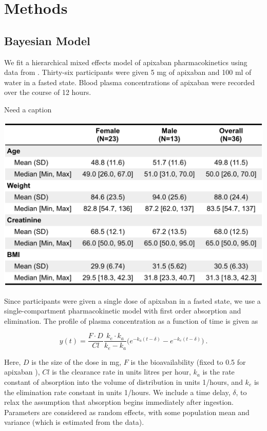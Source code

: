 \section{Methods}

\subsection*{Bayesian Model}

We fit a hierarchical mixed effects model of apixaban pharmacokinetics using data from \cite{Beaton2018-el}.  Thirty-six participants were given 5 mg of apixaban and 100 ml of water in a fasted state. Blood plasma concentrations of apixaban were recorded over the course of 12 hours.



\begin{table}[htb]
	\centering
	\caption{Need a caption} 
	\label{tab:my table} 
	\includegraphics[width=0.7\linewidth]{figs/table1}
\end{table}


\noindent Since participants were given a single dose of apixaban in a fasted state, we use a single-compartment pharmacokinetic model with first order absorption and elimination. The profile of plasma concentration as a function of time is given as

\begin{equation} \label{eq:eq_1}
y(t) = \dfrac{F \cdot D}{Cl} \dfrac{k_e \cdot k_a}{k_e - k_a}\Bigg( e^{-k_a (t-\delta)} - e^{-k_e(t-\delta)} \Bigg) \>.
\end{equation}

\noindent Here, $D$ is the size of the dose in mg, $F$ is the bioavailability (fixed to 0.5 for apixaban \cite{Byon2019-gf} ), $Cl$ is the clearance rate in units litres per hour, $k_a$ is the rate constant of absorption into the volume of distribution in units 1/hours, and $k_e$ is the elimination rate constant in units 1/hours. We include a time delay, $\delta$, to relax the assumption that absorption begins immediately after ingestion.  Parameters are considered as random effects, with some population mean and variance (which is estimated from the data). 

